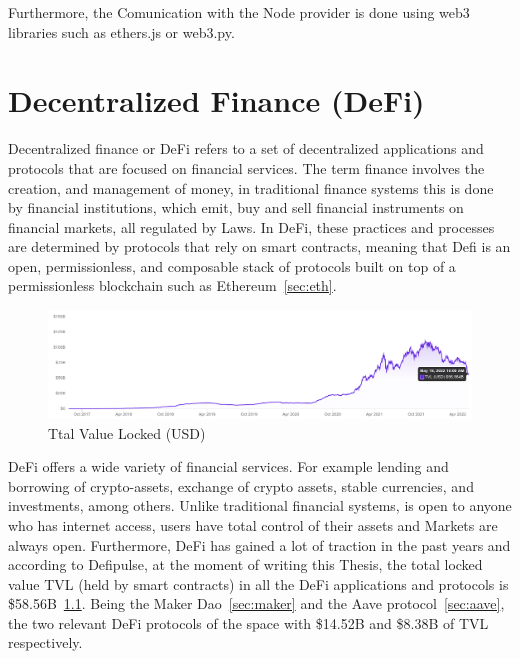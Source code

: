 \documentclass[11pt,a4paper]{report}
\begin{document}
Furthermore, the Comunication with the Node provider is done using web3 libraries such as ethers.js\cite{ethersjs} or web3.py\cite{web3py}.
\chapter{Decentralized Finance (DeFi)} \label{ch:defi}
Decentralized finance or DeFi\cite{article:cefidefi}\cite{article:defi} refers to a set of decentralized applications and protocols that are focused on financial services. The term finance\cite{wiki:Finance} involves the creation, and management of money, in traditional finance systems this is done by financial institutions\cite{wiki:Financial_institution}, which emit, buy and sell financial instruments\cite{wiki:Financial_instrument} on financial markets\cite{wiki:Financial_market}, all regulated by Laws. In DeFi,  these practices and processes are determined by protocols that rely on smart contracts, meaning that Defi is an open, permissionless, and composable stack of protocols built on top of a permissionless blockchain such as Ethereum~\ref{sec:eth}. 
\begin{figure}[htp]
	\centering
	\includegraphics[width=1\textwidth]{./images/tvl}
	\caption{Ttal Value Locked (USD)\cite{defipulse}}
	\label{fig:tvl}
\end{figure}

DeFi offers a wide variety of financial services. For example lending and borrowing of crypto-assets, exchange of crypto assets, stable currencies, and investments, among others. Unlike traditional financial systems, is open to anyone who has internet access,  users have total control of their assets and Markets are always open. Furthermore, DeFi has gained a lot of traction in the past years and according to Defipulse\cite{defipulse}, at the moment of writing this Thesis, the total locked value TVL (held by smart contracts) in all the DeFi applications and protocols is \$58.56B~\ref{fig:tvl}. Being the Maker Dao~\ref{sec:maker} and the Aave protocol~\ref{sec:aave}, the two relevant DeFi protocols of the space with \$14.52B and \$8.38B of TVL respectively. 
\end{document}
